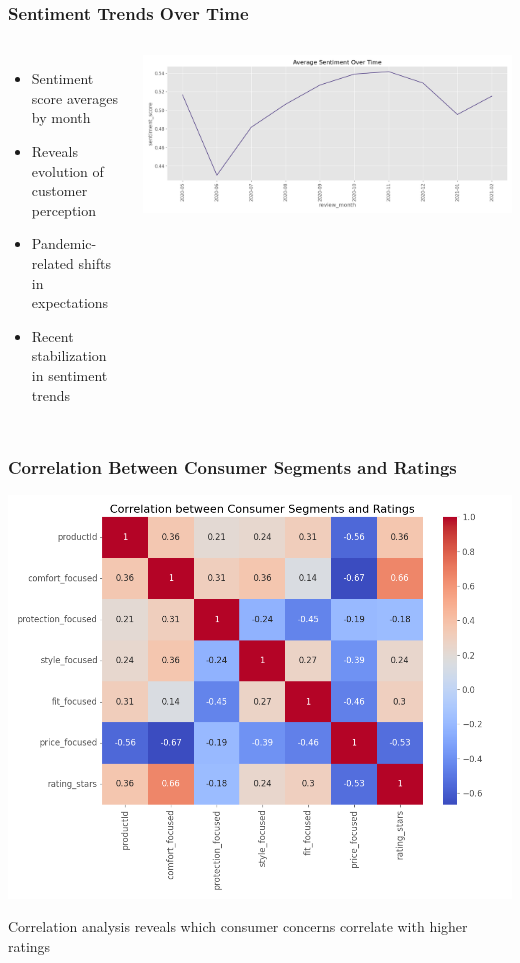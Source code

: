 \documentclass[aspectratio=169]{beamer}
\begin{document}
\begin{frame}
\frametitle{Sentiment Trends Over Time}
\begin{columns}
\begin{itemize}
    \item Sentiment score averages by month
    \item Reveals evolution of customer perception
    \item Pandemic-related shifts in expectations
    \item Recent stabilization in sentiment trends
\end{itemize}
\includegraphics[width=\textwidth]{plots/sentiment_over_time.png}
\end{columns}
\end{frame}

\begin{frame}
\frametitle{Correlation Between Consumer Segments and Ratings}
\centering
\includegraphics[height=0.8\textheight]{plots/segment_rating_correlation.png}

\small{Correlation analysis reveals which consumer concerns correlate with higher ratings}
\end{frame}
\end{document}
